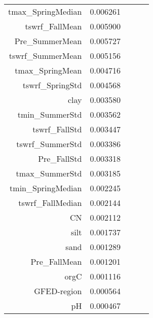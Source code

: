\begin{tabular}{rrrrr}
tmax_SpringMedian & 0.006261 \\
tswrf_FallMean & 0.005900 \\
Pre_SummerMean & 0.005727 \\
tswrf_SummerMean & 0.005156 \\
tmax_SpringMean & 0.004716 \\
tswrf_SpringStd & 0.004568 \\
clay & 0.003580 \\
tmin_SummerStd & 0.003562 \\
tswrf_FallStd & 0.003447 \\
tswrf_SummerStd & 0.003386 \\
Pre_FallStd & 0.003318 \\
tmax_SummerStd & 0.003185 \\
tmin_SpringMedian & 0.002245 \\
tswrf_FallMedian & 0.002144 \\
CN & 0.002112 \\
silt & 0.001737 \\
sand & 0.001289 \\
Pre_FallMean & 0.001201 \\
orgC & 0.001116 \\
GFED-region & 0.000564 \\
pH & 0.000467 \\
\bottomrule
\end{tabular}
